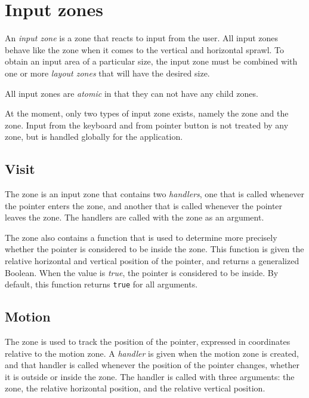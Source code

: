 
\section{Input zones}
\label{sec-zones-input}

An \emph{input zone} is a zone that reacts to input from the user.
All input zones behave like the  zone when it comes to
the vertical and horizontal sprawl.  To obtain an input area of a
particular size, the input zone must be combined with one or more
\emph{layout zones} that will have the desired size.

All input zones are \emph{atomic} in that they can not have any child
zones.

At the moment, only two types of input zone exists, namely the
 zone and the  zone.  Input from the keyboard
and from pointer button is not treated by any zone, but is handled
globally for the application.  

\subsection{Visit}
\label{sec-zones-input-visit}

The  zone is an input zone that contains two
\emph{handlers}, one that is called whenever the pointer enters the
zone, and another that is called whenever the pointer leaves the zone.
The handlers are called with the zone as an argument.

The  zone also contains a function that is used to
determine more precisely whether the pointer is considered to be
inside the zone.  This function is given the relative horizontal and
vertical position of the pointer, and returns a generalized Boolean.
When the value is \emph{true}, the pointer is considered to be
inside.  By default, this function returns \texttt{true} for all
arguments. 

\subsection{Motion}
\label{sec-zones-input-motion}

The  zone is used to track the position of the pointer,
expressed in coordinates relative to the motion zone.  A
\emph{handler} is given when the motion zone is created, and that
handler is called whenever the position of the pointer changes,
whether it is outside or inside the zone.  The handler is called with
three arguments: the zone, the relative horizontal position, and the
relative vertical position. 


